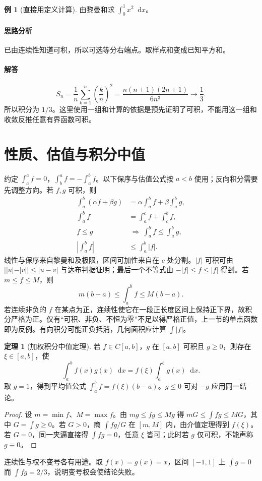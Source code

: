 \documentclass[UTF8,fontset=fandol,12pt,oneside,openany]{ctexrep}
\newcommand{\dd}{\mathop{}\!\mathrm d}
\theoremstyle{definition}
\newtheorem{theorem}{定理}[chapter]
\newtheorem{example}{例}[chapter]
\begin{document}
\begin{example}[直接用定义计算]
由黎曼和求 $\int_0^1x^2\dd x$。
\end{example}
\paragraph{思路分析} 已由连续性知道可积，所以可选等分右端点。取样点和变成已知平方和。
\paragraph{解答}
\[S_n=\frac1n\sum_{k=1}^n\left(\frac kn\right)^2
=\frac{n(n+1)(2n+1)}{6n^3}\longrightarrow\frac13.\]
所以积分为 $1/3$。这里使用一组和计算的依据是预先证明了可积，不能用这一组和收敛反推任意有界函数可积。

\section{性质、估值与积分中值}
\label{lec:11:mean}
约定 $\int_a^a f=0$，$\int_b^a f=-\int_a^b f$。以下保序与估值公式按 $a<b$ 使用；反向积分需要先调整方向。若 $f,g$ 可积，则
\begin{align*}
\int_a^b(\alpha f+\beta g)&=\alpha\int_a^b f+\beta\int_a^b g,\\
\int_a^b f&=\int_a^c f+\int_c^b f,\\
f\le g&\ \Longrightarrow\ \int_a^b f\le\int_a^b g,\\
\left|\int_a^b f\right|&\le\int_a^b|f|.
\end{align*}
线性与保序来自黎曼和及极限，区间可加性来自在 $c$ 处分割。$|f|$ 可积可由 $||u|-|v||\le|u-v|$ 与达布判据证明；最后一个不等式由 $-|f|\le f\le|f|$ 得到。若 $m\le f\le M$，则
\[m(b-a)\le\int_a^b f\le M(b-a).\]
若连续非负的 $f$ 在某点为正，连续性使它在一段正长度区间上保持正下界，故积分严格为正。仅有“可积、非负、不恒为零”不足以得严格正值，上一节的单点函数即为反例。有向积分可能正负抵消，几何面积应计算 $\int|f|$。

\begin{theorem}[加权积分中值定理]
若 $f\in C[a,b]$，$g$ 在 $[a,b]$ 可积且 $g\ge0$，则存在 $\xi\in[a,b]$，使
\[\int_a^b f(x)g(x)\dd x=f(\xi)\int_a^b g(x)\dd x.\]
取 $g=1$，得到平均值公式 $\int_a^b f=f(\xi)(b-a)$。$g\le0$ 可对 $-g$ 应用同一结论。
\end{theorem}
\begin{proof}
设 $m=\min f$、$M=\max f$。由 $mg\le fg\le Mg$ 得 $mG\le\int fg\le MG$，其中 $G=\int g\ge0$。若 $G>0$，商 $\int fg/G$ 在 $[m,M]$ 内，由介值定理得到 $f(\xi)$。若 $G=0$，同一夹逼直接得 $\int fg=0$，任意 $\xi$ 皆可；此时若 $g$ 仅可积，不能声称 $g\equiv0$。
\end{proof}
连续性与权不变号各有用途。取 $f(x)=g(x)=x$，区间 $[-1,1]$ 上 $\int g=0$ 而 $\int fg=2/3$，说明变号权会使结论失败。
\end{document}
